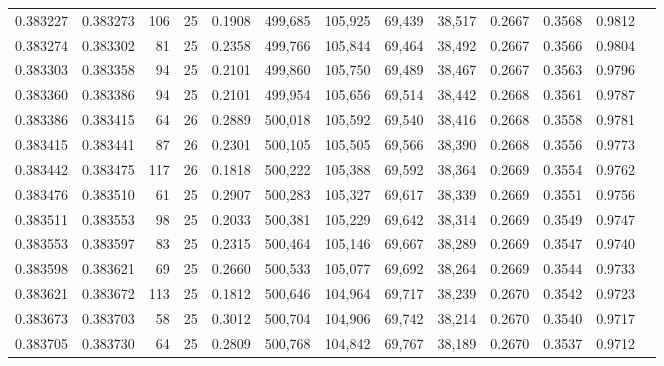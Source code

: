 \begin{tabular}{rrrrrrrrrrrrr}
0.383227 & 0.383273 &   106 &  25 &                                     0.1908 & 499,685 & 105,925 &  69,439 &  38,517 & 0.2667 & 0.3568 & 0.9812 \\
0.383274 & 0.383302 &    81 &  25 &                                     0.2358 & 499,766 & 105,844 &  69,464 &  38,492 & 0.2667 & 0.3566 & 0.9804 \\
0.383303 & 0.383358 &    94 &  25 &                                     0.2101 & 499,860 & 105,750 &  69,489 &  38,467 & 0.2667 & 0.3563 & 0.9796 \\
0.383360 & 0.383386 &    94 &  25 &                                     0.2101 & 499,954 & 105,656 &  69,514 &  38,442 & 0.2668 & 0.3561 & 0.9787 \\
0.383386 & 0.383415 &    64 &  26 &                                     0.2889 & 500,018 & 105,592 &  69,540 &  38,416 & 0.2668 & 0.3558 & 0.9781 \\
0.383415 & 0.383441 &    87 &  26 &                                     0.2301 & 500,105 & 105,505 &  69,566 &  38,390 & 0.2668 & 0.3556 & 0.9773 \\
0.383442 & 0.383475 &   117 &  26 &                                     0.1818 & 500,222 & 105,388 &  69,592 &  38,364 & 0.2669 & 0.3554 & 0.9762 \\
0.383476 & 0.383510 &    61 &  25 &                                     0.2907 & 500,283 & 105,327 &  69,617 &  38,339 & 0.2669 & 0.3551 & 0.9756 \\
0.383511 & 0.383553 &    98 &  25 &                                     0.2033 & 500,381 & 105,229 &  69,642 &  38,314 & 0.2669 & 0.3549 & 0.9747 \\
0.383553 & 0.383597 &    83 &  25 &                                     0.2315 & 500,464 & 105,146 &  69,667 &  38,289 & 0.2669 & 0.3547 & 0.9740 \\
0.383598 & 0.383621 &    69 &  25 &                                     0.2660 & 500,533 & 105,077 &  69,692 &  38,264 & 0.2669 & 0.3544 & 0.9733 \\
0.383621 & 0.383672 &   113 &  25 &                                     0.1812 & 500,646 & 104,964 &  69,717 &  38,239 & 0.2670 & 0.3542 & 0.9723 \\
0.383673 & 0.383703 &    58 &  25 &                                     0.3012 & 500,704 & 104,906 &  69,742 &  38,214 & 0.2670 & 0.3540 & 0.9717 \\
0.383705 & 0.383730 &    64 &  25 &                                     0.2809 & 500,768 & 104,842 &  69,767 &  38,189 & 0.2670 & 0.3537 & 0.9712 \\

\end{tabular}
